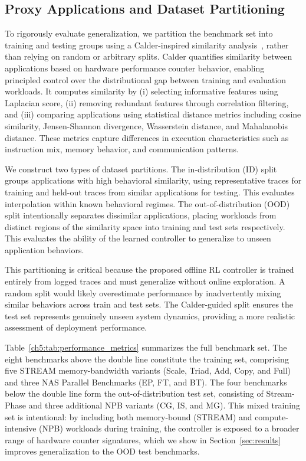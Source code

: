 \subsection{Proxy Applications and Dataset Partitioning}
\label{subsec:proxy_apps}

To rigorously evaluate generalization, we partition the 
benchmark set into training and testing groups using a 
Calder-inspired similarity 
analysis~\cite{chen2025beyondguesscheck}, rather than relying 
on random or arbitrary splits. Calder quantifies similarity 
between applications based on hardware performance counter 
behavior, enabling principled control over the distributional 
gap between training and evaluation workloads. It computes 
similarity by (i) selecting informative features using 
Laplacian score, (ii) removing redundant features through 
correlation filtering, and (iii) comparing applications using 
statistical distance metrics including cosine similarity, 
Jensen-Shannon divergence, Wasserstein distance, and 
Mahalanobis distance. These metrics capture differences in 
execution characteristics such as instruction mix, memory 
behavior, and communication patterns.

We construct two types of dataset partitions. The 
in-distribution (ID) split groups applications with high 
behavioral similarity, using representative traces for training 
and held-out traces from similar applications for testing. This 
evaluates interpolation within known behavioral regimes. The 
out-of-distribution (OOD) split intentionally separates 
dissimilar applications, placing workloads from distinct 
regions of the similarity space into training and test sets 
respectively. This evaluates the ability of the learned 
controller to generalize to unseen application behaviors.

This partitioning is critical because the proposed offline RL 
controller is trained entirely from logged traces and must 
generalize without online exploration. A random split would 
likely overestimate performance by inadvertently mixing similar 
behaviors across train and test sets. The Calder-guided split 
ensures the test set represents genuinely unseen system 
dynamics, providing a more realistic assessment of deployment 
performance.

Table~\ref{ch5:tab:performance_metrics} summarizes the full 
benchmark set. The eight benchmarks above the double line 
constitute the training set, comprising five STREAM 
memory-bandwidth variants (Scale, Triad, Add, Copy, and Full) 
and three NAS Parallel Benchmarks (EP, FT, and BT). The four 
benchmarks below the double line form the out-of-distribution 
test set, consisting of Stream-Phase and three additional NPB 
variants (CG, IS, and MG). This mixed training set is 
intentional: by including both memory-bound (STREAM) and 
compute-intensive (NPB) workloads during training, the 
controller is exposed to a broader range of hardware counter 
signatures, which we show in Section~\ref{sec:results} 
improves generalization to the OOD test benchmarks.

